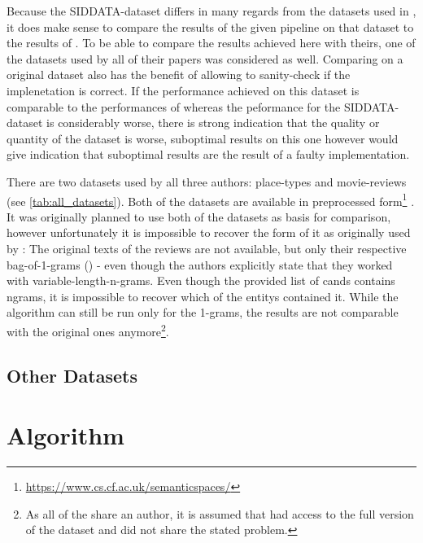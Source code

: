 Because the SIDDATA-dataset differs in many regards from the datasets used in \mainalgos, %
it does make sense to compare the results of the given pipeline on that dataset to the results of \mainalgos. To be able to compare the results achieved here with theirs, one of the datasets used by all of their papers was considered as well. Comparing on a original dataset also has the benefit of allowing to sanity-check if the implenetation is correct. If the performance achieved on this dataset is comparable to the performances of \mainalgos whereas the peformance for the SIDDATA-dataset is considerably worse, there is strong indication that the quality or quantity of the dataset is worse, suboptimal results on this one however would give indication that suboptimal results are the result of a faulty implementation.

There are two datasets used by all three authors: place-types and movie-reviews (see \autoref{tab:all_datasets}). Both of the datasets are available in preprocessed form\footnote{\url{https://www.cs.cf.ac.uk/semanticspaces/}} \cite{Derrac2015}. It was originally planned to use both of the datasets as basis for comparison, however unfortunately it is impossible to recover the form of it as originally used by \textcite{Derrac2015}: The original texts of the reviews are not available, but only their respective bag-of-1-grams () - even though the authors explicitly state that they worked with variable-length-n-grams. Even though the provided list of \glspl{cand} contains \glspl{ngram}, it is impossible to recover which of the \glspl{entity} contained it. While the algorithm can still be run only for the 1-grams, the results are not comparable with the original ones anymore\footnote{As all of the \mainalgos share an author, it is assumed that \cite{Alshaikh2020,Ager2018} had access to the full version of the dataset and did not share the stated problem.}.


\subsection{Other Datasets}



\section{Algorithm}


